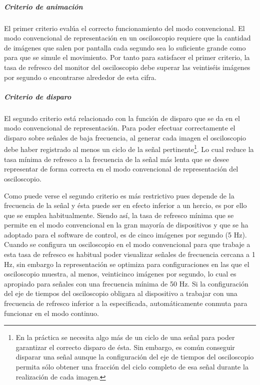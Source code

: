 \subparagraph{Criterio de animación}

El primer criterio evalúa el correcto funcionamiento del modo convencional. El modo convencional de representación en un osciloscopio requiere que la cantidad de imágenes que salen por pantalla cada segundo sea lo suficiente grande como para que se simule el movimiento. Por tanto para satisfacer el primer criterio, la tasa de refresco del monitor del osciloscopio debe superar las veintiséis imágenes por segundo o encontrarse alrededor de esta cifra.


\subparagraph{Criterio de disparo}

El segundo criterio está relacionado con la función de disparo que se da en el modo convencional de representación. Para poder efectuar correctamente el disparo sobre señales de baja frecuencia, al generar cada imagen el osciloscopio debe haber registrado al menos un ciclo de la señal pertinente\footnote{En la práctica se necesita algo más de un ciclo de una señal para poder garantizar el correcto disparo de ésta. Sin embargo, es común conseguir disparar una señal aunque la configuración del eje de tiempos del osciloscopio permita sólo obtener una fracción del ciclo completo de esa señal durante la realización de cada imagen.}. Lo cual reduce la tasa mínima de refresco a la frecuencia de la señal más lenta que se desee representar de forma correcta en el modo convencional de representación del osciloscopio.\par

Como puede verse el segundo criterio es más restrictivo pues depende de la frecuencia de la señal y ésta puede ser en efecto inferior a un hercio, es por ello que se emplea habitualmente. Siendo así, la tasa de refresco mínima que se permite en el modo convencional en la gran mayoría de dispositivos y que se ha adoptado para el software de control, es de cinco imágenes por segundo (5 Hz). Cuando se configura un osciloscopio en el modo convencional para que trabaje a esta tasa de refresco es habitual poder visualizar señales de frecuencia cercana a 1 Hz, sin embargo la representación se optimiza para configuraciones en las que el osciloscopio muestra, al menos, veinticinco imágenes por segundo, lo cual es apropiado para señales con una frecuencia mínima de 50 Hz. Si la configuración del eje de tiempos del osciloscopio obligara al dispositivo a trabajar con una frecuencia de refresco inferior a la especificada, automáticamente conmuta para funcionar en el modo continuo.\par


